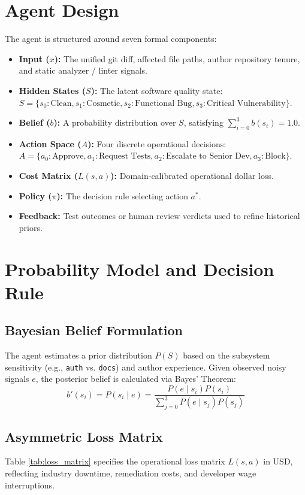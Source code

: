 \documentclass[10pt,twocolumn,letterpaper]{article}
\begin{document}
\section{Agent Design}
The agent is structured around seven formal components:
\begin{itemize}
    \item \textbf{Input ($x$):} The unified git diff, affected file paths, author repository tenure, and static analyzer / linter signals.
    \item \textbf{Hidden States ($S$):} The latent software quality state:
    $S = \{s_0: \text{Clean}, s_1: \text{Cosmetic}, s_2: \text{Functional Bug}, s_3: \text{Critical Vulnerability}\}$.
    \item \textbf{Belief ($b$):} A probability distribution over $S$, satisfying $\sum_{i=0}^3 b(s_i) = 1.0$.
    \item \textbf{Action Space ($A$):} Four discrete operational decisions:
    $A = \{a_0: \text{Approve}, a_1: \text{Request Tests}, a_2: \text{Escalate to Senior Dev}, a_3: \text{Block}\}$.
    \item \textbf{Cost Matrix ($L(s, a)$):} Domain-calibrated operational dollar loss.
    \item \textbf{Policy ($\pi$):} The decision rule selecting action $a^*$.
    \item \textbf{Feedback:} Test outcomes or human review verdicts used to refine historical priors.
\end{itemize}

\section{Probability Model and Decision Rule}
\subsection{Bayesian Belief Formulation}
The agent estimates a prior distribution $P(S)$ based on the subsystem sensitivity (e.g., \texttt{auth} vs. \texttt{docs}) and author experience. Given observed noisy signals $e$, the posterior belief is calculated via Bayes' Theorem:
\begin{equation}
b'(s_i) = P(s_i \mid e) = \frac{P(e \mid s_i) P(s_i)}{\sum_{j=0}^3 P(e \mid s_j) P(s_j)}
\end{equation}

\subsection{Asymmetric Loss Matrix}
Table \ref{tab:loss_matrix} specifies the operational loss matrix $L(s, a)$ in USD, reflecting industry downtime, remediation costs, and developer wage interruptions.
\end{document}
